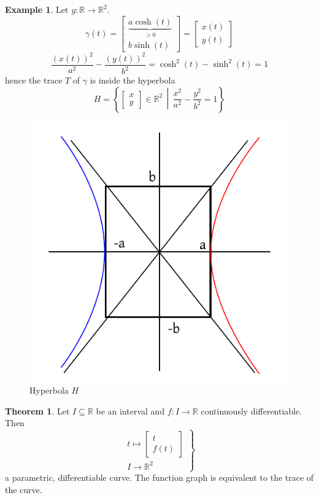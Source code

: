 \documentclass[a4paper,landscape,twocolumn]{article}
\theoremstyle{definition}
\newtheorem{theorem}{Theorem}
\newtheorem{ex}{Example}
\newcommand\setdef[2]{\left\{#1\,\middle|\,#2\right\}}
\begin{document}
\begin{ex}
  Let $y: \mathbb R \to \mathbb R^2$.
  \[
    \gamma(t)
      = \begin{bmatrix} \underbrace{a \cosh(t)}_{>0} \\ b \sinh(t) \end{bmatrix}
      = \begin{bmatrix} x(t) \\ y(t) \end{bmatrix}
  \] \[
    \frac{(x(t))^2}{a^2} - \frac{(y(t))^2}{b^2} = \cosh^2(t) - \sinh^2(t) = 1
  \]
  hence the trace $T$ of $\gamma$ is inside the hyperbola
  \[ H = \setdef{\begin{bmatrix} x \\ y \end{bmatrix} \in \mathbb R^2}{\frac{x^2}{a^2} - \frac{y^2}{b^2} = 1} \]
  \begin{figure}[h!]
    \begin{center}
      \includegraphics{img/hyperbolic_hyperbola.pdf}
      \caption{Hyperbola $H$}
    \end{center}
  \end{figure}
\end{ex}

\begin{theorem}
  Let $I \subseteq \mathbb R$ be an interval and $f: I \to \mathbb R$
  continuously differentiable. Then
  \[
    \left.\begin{array}{c}
      t \mapsto \begin{bmatrix} t \\ f(t) \end{bmatrix} \\
      I \to \mathbb R^2
    \end{array}\right\}
  \]
  a parametric, differentiable curve.
  The function graph is equivalent to the trace of the curve.
\end{theorem}
\end{document}
